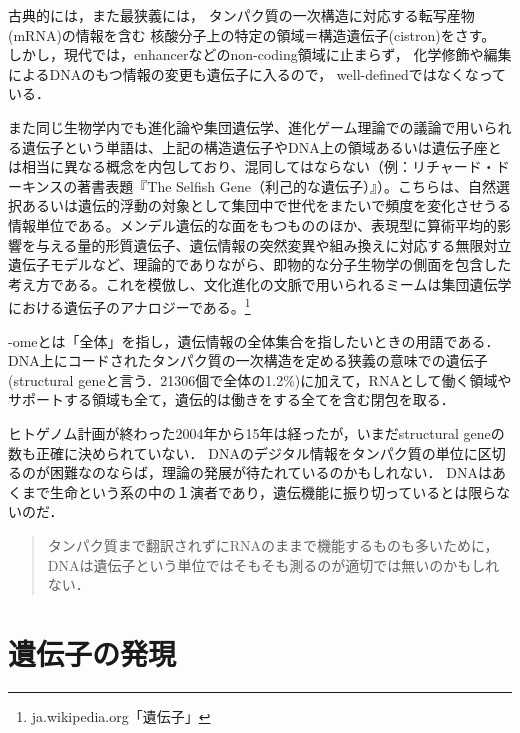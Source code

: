 \documentclass[uplatex, dvipdfmx]{jsreport}
\begin{document}
\begin{definition}
    古典的には，また最狭義には，
    タンパク質の一次構造に対応する転写産物(mRNA)の情報を含む
    核酸分子上の特定の領域＝構造遺伝子(cistron)をさす。
    しかし，現代では，enhancerなどのnon-coding領域に止まらず，
    化学修飾や編集によるDNAのもつ情報の変更も遺伝子に入るので，
    well-definedではなくなっている．
\end{definition}
\begin{remark}[進化論での遺伝子]
    また同じ生物学内でも進化論や集団遺伝学、進化ゲーム理論での議論で用いられる遺伝子という単語は、上記の構造遺伝子やDNA上の領域あるいは遺伝子座とは相当に異なる概念を内包しており、混同してはならない（例：リチャード・ドーキンスの著書表題『The Selfish Gene（利己的な遺伝子）』）。こちらは、自然選択あるいは遺伝的浮動の対象として集団中で世代をまたいで頻度を変化させうる情報単位である。メンデル遺伝的な面をもつもののほか、表現型に算術平均的影響を与える量的形質遺伝子、遺伝情報の突然変異や組み換えに対応する無限対立遺伝子モデルなど、理論的でありながら、即物的な分子生物学の側面を包含した考え方である。これを模倣し、文化進化の文脈で用いられるミームは集団遺伝学における遺伝子のアナロジーである。\footnote{ja.wikipedia.org「遺伝子」}
\end{remark}

\begin{definition}[genome]
    -omeとは「全体」を指し，遺伝情報の全体集合を指したいときの用語である．
    DNA上にコードされたタンパク質の一次構造を定める狭義の意味での遺伝子(structural geneと言う．21306個で全体の1.2\%\cite{protein-coding domain})に加えて，RNAとして働く領域やサポートする領域も全て，遺伝的は働きをする全てを含む閉包を取る．
\end{definition}
\begin{remark}
    ヒトゲノム計画が終わった2004年から15年は経ったが，いまだstructural geneの数も正確に決められていない．
    DNAのデジタル情報をタンパク質の単位に区切るのが困難なのならば，理論の発展が待たれているのかもしれない．
    DNAはあくまで生命という系の中の１演者であり，遺伝機能に振り切っているとは限らないのだ．
    \begin{quote}
        タンパク質まで翻訳されずにRNAのままで機能するものも多いために，DNAは遺伝子という単位ではそもそも測るのが適切では無いのかもしれない．\cite{白木賢太郎}
    \end{quote}
\end{remark}

\section{遺伝子の発現}
\end{document}
